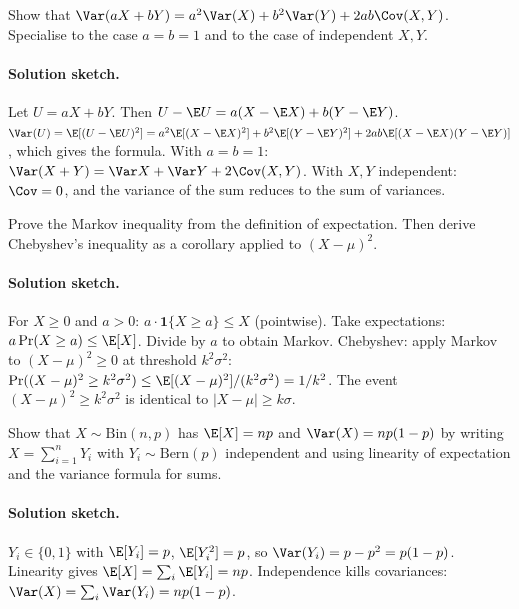 \begin{exercise}
Show that $\Var(aX + bY) = a^{2}\Var(X) + b^{2}\Var(Y) + 2ab
\Cov(X, Y)$. Specialise to the case $a = b = 1$ and to the case
of independent $X, Y$.
\end{exercise}

\paragraph{Solution sketch.}
Let $U = aX + bY$. Then $U - \E U = a(X - \E X) + b(Y - \E Y)$.
$\Var(U) = \E[(U - \E U)^{2}] = a^{2}\E[(X - \E X)^{2}] + b^{2}
\E[(Y - \E Y)^{2}] + 2ab \E[(X - \E X)(Y - \E Y)]$, which gives the
formula. With $a = b = 1$: $\Var(X + Y) = \Var X + \Var Y + 2\Cov(X,
Y)$. With $X, Y$ independent: $\Cov = 0$, and the variance of the
sum reduces to the sum of variances.

\begin{exercise}
Prove the Markov inequality from the definition of expectation.
Then derive Chebyshev's inequality as a corollary applied to
$(X - \mu)^{2}$.
\end{exercise}

\paragraph{Solution sketch.}
For $X \geq 0$ and $a > 0$: $a \cdot \mathbf{1}\{X \geq a\} \leq X$
(pointwise). Take expectations: $a \Pr(X \geq a) \leq \E[X]$. Divide
by $a$ to obtain Markov. Chebyshev: apply Markov to $(X - \mu)^{2}
\geq 0$ at threshold $k^{2}\sigma^{2}$: $\Pr((X - \mu)^{2} \geq
k^{2}\sigma^{2}) \leq \E[(X - \mu)^{2}]/(k^{2}\sigma^{2}) = 1/k^{2}$.
The event $(X - \mu)^{2} \geq k^{2}\sigma^{2}$ is identical to
$|X - \mu| \geq k\sigma$.

\begin{exercise}
Show that $X \sim \mathrm{Bin}(n, p)$ has $\E[X] = np$ and
$\Var(X) = np(1 - p)$ by writing $X = \sum_{i=1}^{n} Y_{i}$ with
$Y_{i} \sim \mathrm{Bern}(p)$ independent and using linearity of
expectation and the variance formula for sums.
\end{exercise}

\paragraph{Solution sketch.}
$Y_{i} \in \{0, 1\}$ with $\E[Y_{i}] = p$, $\E[Y_{i}^{2}] = p$, so
$\Var(Y_{i}) = p - p^{2} = p(1 - p)$. Linearity gives $\E[X] =
\sum_{i} \E[Y_{i}] = np$. Independence kills covariances:
$\Var(X) = \sum_{i} \Var(Y_{i}) = np(1 - p)$.

